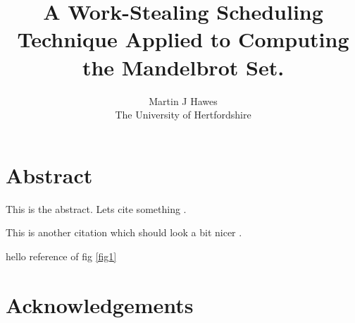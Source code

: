 

\title{
\huge A Work-Stealing Scheduling Technique Applied to Computing the Mandelbrot Set.
}

\author{
  Martin J Hawes\\
  The University of Hertfordshire \\
}



\maketitle
\date{}

\section{Abstract}
This is the abstract. Lets cite something \cite[p.~201]{blank}.

This is another citation which should look a bit nicer \cite{jmcguin}.


hello reference of fig \ref{fig1}

\nocite{another}

\section{Acknowledgements}

\tableofcontents

